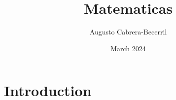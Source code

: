 \documentclass{article}
\title{Matematicas}
\author{Augusto Cabrera-Becerril}
\date{March 2024}
\begin{document}
\maketitle

\section{Introduction}
\end{document}
